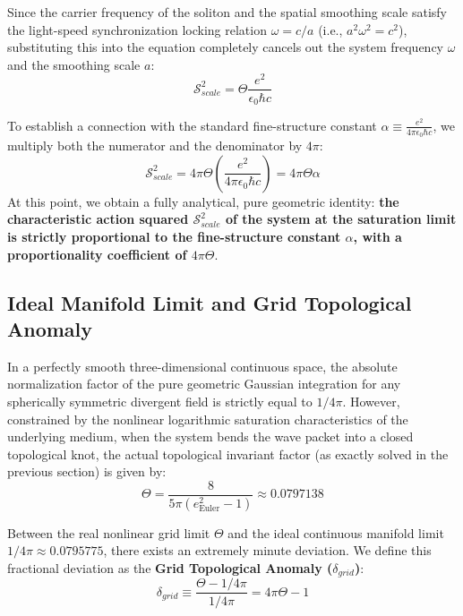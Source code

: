\documentclass[12pt, a4paper]{article}
\begin{document}
Since the carrier frequency of the soliton and the spatial smoothing scale satisfy the light-speed synchronization locking relation $\omega = c/a$ (i.e., $a^2 \omega^2 = c^2$), substituting this into the equation completely cancels out the system frequency $\omega$ and the smoothing scale $a$:
\begin{equation}
\mathcal{S}_{scale}^2 = \Theta \frac{e^2}{\epsilon_0 \hbar c}
\end{equation}

To establish a connection with the standard fine-structure constant $\alpha \equiv \frac{e^2}{4\pi\epsilon_0\hbar c}$, we multiply both the numerator and the denominator by $4\pi$:
\begin{equation}
\mathcal{S}_{scale}^2 = 4\pi \Theta \left( \frac{e^2}{4\pi\epsilon_0\hbar c} \right) = 4\pi \Theta \alpha
\end{equation}
At this point, we obtain a fully analytical, pure geometric identity: \textbf{the characteristic action squared $\mathcal{S}_{scale}^2$ of the system at the saturation limit is strictly proportional to the fine-structure constant $\alpha$, with a proportionality coefficient of $4\pi\Theta$}.

\subsection{Ideal Manifold Limit and Grid Topological Anomaly}

In a perfectly smooth three-dimensional continuous space, the absolute normalization factor of the pure geometric Gaussian integration for any spherically symmetric divergent field is strictly equal to $1/4\pi$. However, constrained by the nonlinear logarithmic saturation characteristics of the underlying medium, when the system bends the wave packet into a closed topological knot, the actual topological invariant factor (as exactly solved in the previous section) is given by:
\begin{equation}
\Theta = \frac{8}{5\pi (e_{\text{Euler}}^2 - 1)} \approx 0.0797138
\end{equation}

Between the real nonlinear grid limit $\Theta$ and the ideal continuous manifold limit $1/4\pi \approx 0.0795775$, there exists an extremely minute deviation. We define this fractional deviation as the \textbf{Grid Topological Anomaly ($\delta_{grid}$)}:
\begin{equation}
\delta_{grid} \equiv \frac{\Theta - 1/4\pi}{1/4\pi} = 4\pi\Theta - 1
\end{equation}
\end{document}
